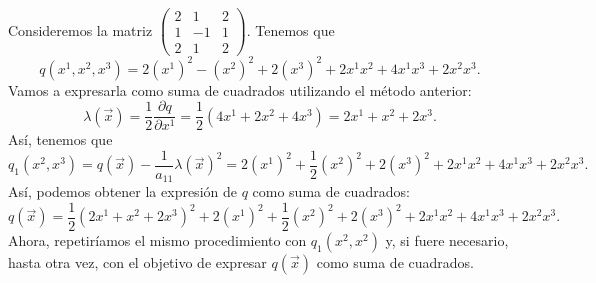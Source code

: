 \begin{eg}
	\normalfont Consideremos la matriz $\displaystyle \begin{pmatrix} 2 & 1 & 2 \\ 1 & - 1 & 1 \\ 2 & 1 & 2 \end{pmatrix} $. Tenemos que 
	\[q\left(x^{1}, x^{2}, x^{3}\right) = 2\left(x^{1}\right)^{2} - \left(x^{2}\right)^{2} + 2\left(x^{3}\right)^{2} + 2x^{1}x^{2} + 4x^{1}x^{3}+2x^{2}x^{3} .\]
	Vamos a expresarla como suma de cuadrados utilizando el método anterior:
	\[ \lambda\left(\vec{x}\right) = \frac{1}{2}\frac{\partial q}{\partial x^{1}} = \frac{1}{2}\left(4x^{1}+2x^{2}+4x^{3}\right) = 2x^{1} + x^{2} + 2x^{3} .\]
	Así, tenemos que 
	\[q_{1}\left(x^{2}, x^{3}\right) = q\left(\vec{x}\right)-\frac{1}{a_{11}}\lambda\left(\vec{x}\right)^{2} = 2\left(x^{1}\right)^{2}+\frac{1}{2}\left(x^{2}\right)^{2} + 2\left(x^{3}\right)^{2}+2x^{1}x^{2}+4x^{1}x^{3}+2x^{2}x^{3}.\]
	Así, podemos obtener la expresión de $\displaystyle q $ como suma de cuadrados:
	\[q\left(\vec{x}\right) = \frac{1}{2}\left(2x^{1}+x^{2}+2x^{3}\right)^{2} +2\left(x^{1}\right)^{2}+\frac{1}{2}\left(x^{2}\right)^{2} + 2\left(x^{3}\right)^{2}+2x^{1}x^{2}+4x^{1}x^{3}+2x^{2}x^{3}  .\]
	Ahora, repetiríamos el mismo procedimiento con $\displaystyle q_{1}\left(x^{2}, x^{2}\right) $ y, si fuere necesario, hasta otra vez, con el objetivo de expresar $\displaystyle q\left(\vec{x}\right) $ como suma de cuadrados.
\end{eg}
